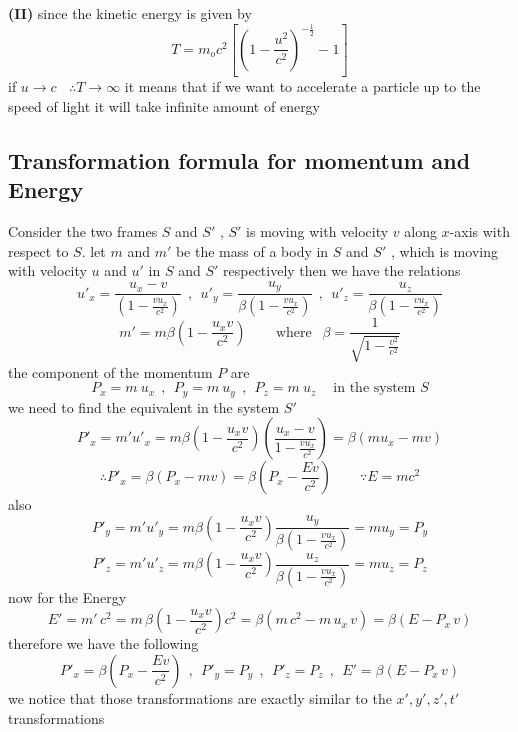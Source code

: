 \documentclass{article}
\begin{document}
\textbf{(II)} since the kinetic energy is given by
\[
T = m_o c^2 \left[{\left(1- \frac{u^2}{c^2}\right)}^{-\frac{1}{2}}-1\right]
\]
if $u \to c  \ \ \ \  \therefore T \to \infty $ it means that if we want to accelerate a particle up to the speed of light it will take infinite amount of energy
\subsection{Transformation formula for momentum and Energy}
Consider the two frames $S$ and $S'$ , $S'$ is moving with velocity $v$ along $x$-axis with respect to $S$. let $m$ and $m'$ be the mass of a body in $S$ and $S'$ , which is moving with velocity $u$ and $u'$ in $S$ and $S'$ respectively
then we have the relations
\[
u'_x = \frac{u_x - v}{\left(1 - \frac{vu_x}{c^2}\right)}
\ \ , \ \ 
u'_y = \frac{u_y}{\beta\left(1 - \frac{vu_x}{c^2}\right)}
\ \ , \ \ 
u'_z = \frac{u_z}{\beta\left(1 - \frac{vu_x}{c^2}\right)}
\]
\[ 
    m' = m \beta\left(1-\frac{u_x v}{c^2}\right) \ \ \ \ \ \ \ \ \text{ where } \ \ \beta = \frac{1}{\sqrt{1-\frac{v^2}{c^2}}}
\]
the component of the momentum $P$ are 
\[
P_x = m \ u_x
\ \ , \ \    
P_y = m \ u_y
\ \ , \ \  
P_z = m \ u_z
\ \ \ \  
\text{ in the system } S
\]
we need to find the equivalent in the system $S'$
\[
P'_x = m'u'_x = m \beta\left(1-\frac{u_x v}{c^2}\right) \left(\frac{u_x - v}{1 - \frac{vu_x}{c^2}}\right) = \beta\left(m u_x - m v\right)
\]
\[
\therefore     P'_x = \beta\left(P_x - m v\right) = \beta\left(P_x - \frac{Ev}{c^2}\right)  \ \ \ \ \ \ \ \ \ \because E=m c^2
\]
also
\[
P'_y = m'u'_y = m \beta\left(1-\frac{u_x v}{c^2}\right) \frac{u_y}{\beta\left(1 - \frac{vu_x}{c^2}\right)} = m u_y = P_y
\]
\[
P'_z = m'u'_z = m \beta\left(1-\frac{u_x v}{c^2}\right) \frac{u_z}{\beta\left(1 - \frac{vu_x}{c^2}\right)} = m u_z = P_z
\]
now for the Energy
\[
E' = m'\,c^2 = m\,\beta\left(1-\frac{u_x v}{c^2}\right) c^2 = \beta\left(m\,c^2 - m\, u_x\, v\right) = \beta\left(E - P_x\, v\right)
\]
therefore we have the following
\[
    P'_x = \beta\left(P_x - \frac{Ev}{c^2}\right)
    \ \ , \ \  
    P'_y = P_y
    \ \ , \ \  
    P'_z = P_z
    \ \ , \ \ 
    E' =\beta\left(E - P_x\, v\right)
\]
we notice that those transformations are exactly similar to the $x',y',z',t'$ transformations
\end{document}
